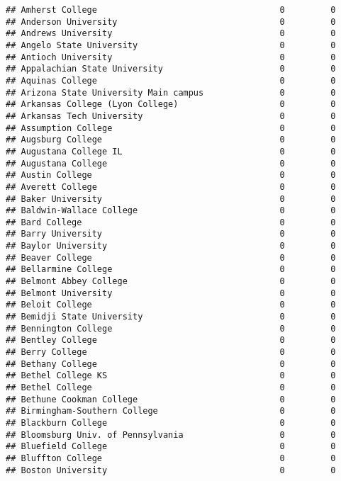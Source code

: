 \documentclass[
]{article}
\begin{document}
\begin{verbatim}
## Amherst College                                    0         0
## Anderson University                                0         0
## Andrews University                                 0         0
## Angelo State University                            0         0
## Antioch University                                 0         0
## Appalachian State University                       0         0
## Aquinas College                                    0         0
## Arizona State University Main campus               0         0
## Arkansas College (Lyon College)                    0         0
## Arkansas Tech University                           0         0
## Assumption College                                 0         0
## Augsburg College                                   0         0
## Augustana College IL                               0         0
## Augustana College                                  0         0
## Austin College                                     0         0
## Averett College                                    0         0
## Baker University                                   0         0
## Baldwin-Wallace College                            0         0
## Bard College                                       0         0
## Barry University                                   0         0
## Baylor University                                  0         0
## Beaver College                                     0         0
## Bellarmine College                                 0         0
## Belmont Abbey College                              0         0
## Belmont University                                 0         0
## Beloit College                                     0         0
## Bemidji State University                           0         0
## Bennington College                                 0         0
## Bentley College                                    0         0
## Berry College                                      0         0
## Bethany College                                    0         0
## Bethel College KS                                  0         0
## Bethel College                                     0         0
## Bethune Cookman College                            0         0
## Birmingham-Southern College                        0         0
## Blackburn College                                  0         0
## Bloomsburg Univ. of Pennsylvania                   0         0
## Bluefield College                                  0         0
## Bluffton College                                   0         0
## Boston University                                  0         0

\end{verbatim}
\end{document}
